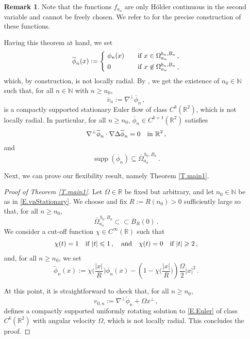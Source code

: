 \documentclass[11pt,oneside]{amsart}
\theoremstyle{definition}
\newtheorem{remark}[theorem]{Remark}
\newcommand{\Om}{\Omega}
\def\NN{\mathbb{N}}
\def\RR{\mathbb{R}}
\newcommand{\supp}{\operatorname{supp}}
\renewcommand\leq\leqslant
\renewcommand\geq\geqslant
\numberwithin{equation}{section}
\begin{document}
\begin{remark}
    Note that the functions $f_{a_n}$ are only H\"older continuous in the second variable and cannot be freely chosen. We refer to \cite[Sections 2 and 3]{EFR} for the precise construction of these functions. 
\end{remark}

Having this theorem at hand, we set 
$$
\overline{\phi}_n(x) := \left \{
\begin{aligned}
\ & \phi_n(x) \quad && \textup{if } x \in \Om_{a_n}^{b_n,B_n}\,,\\
& 0 && \textup{if } x \not \in  \Om_{a_n}^{b_n,B_n}\,,
\end{aligned}
\right.
$$
which, by construction, is not locally radial. By \cite[Section 2]{EFR},  we get the existence of $n_0 \in \NN$ such that, for all $n \in \NN$ with $n \geq n_0$,
\begin{equation} \label{E.vnStationary}
\overline{v}_n := \nabla^{\perp} \overline{\phi}_n\,,
\end{equation}
is a compactly supported stationary Euler flow of class $C^k(\RR^2)$, which is not locally radial. In particular, for all $n \geq n_0$, $\overline{\phi}_n \in C^{k+1}(\RR^2)$ satisfies
$$
\nabla^{\perp} \overline{\phi}_n \cdot \nabla \Delta\overline{\phi}_n = 0 \quad \textup{in } \RR^2\,,
$$
and
$$
\supp(\overline{\phi}_n) \subseteq \overline{\Omega}_{a_n}^{\,b_n, B_n}\,.
$$

Next, we can prove our flexibility result, namely Theorem \ref{T.main1}.

\begin{proof}[Proof of Theorem \ref{T.main1}]
Let $\Om \in \RR$ be fixed but arbitrary, and let $n_0 \in \NN$ be as in \eqref{E.vnStationary}. We choose and fix $R := R(n_0)>0$ sufficiently large so that, for all $n \geq n_0$, 
$$
\overline{\Omega}_{a_n}^{\,b_n,B_n} \subset \subset B_{R}(0)\,.
$$
We consider a cut-off function $\chi \in C^\infty(\RR)$ such that
$$
\chi(t) = 1 \quad \textup{if }|t| \leq 1\,, \quad \textup{and} \quad \chi(t) = 0 \quad \textup{if } |t| \geq 2\,, 
$$
and, for all $n \geq n_0$, we set
$$
\widetilde{\phi}_n (x) := \chi\bigg(\frac{|x|}{R} \bigg) \overline{\phi}_n(x) - \left( 1- \chi\bigg(\frac{|x|}{R} \bigg) \right) \frac{\Om}{2}|x|^2\,.
$$

At this point, it is straightforward to check that, for all $n \geq n_0$,
$$
v_{0,n} := \nabla^{\perp} \widetilde{\phi}_n + \Om x^{\perp}\,,
$$
defines a compactly supported uniformly rotating solution to \eqref{E.Euler} of class $C^k(\RR^2)$ with angular velocity $\Om$, which is not locally radial. This concludes the proof. 
\end{proof}
\end{document}

